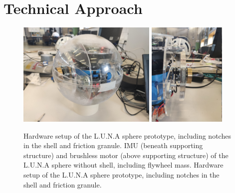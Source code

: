 \section{Technical Approach}
\label{sec:TechnicalApproach}

\begin{figure}
\centering
\includegraphics[height=50mm]{../Media/sphereFullshellLeft.jpg}
\hfill
\includegraphics[height=50mm]{../Media/sphereRightMotor.jpg}   
\label{sec:TechnicalApproach:fig:motor}
\label{sec:TechnicalApproach:fig:prototype}
\caption{Hardware setup of the L.U.N.A sphere prototype, including notches in the shell and friction granule. IMU (beneath supporting structure) and brushless motor (above supporting structure) of the L.U.N.A sphere without shell, including flywheel mass. Hardware setup of the L.U.N.A sphere prototype, including notches in the shell and friction granule.}
\end{figure}



